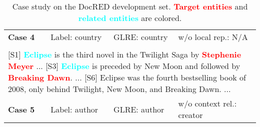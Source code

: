 \documentclass[11pt,a4paper]{article}
\begin{document}
\begin{table}
{\begin{tabular}{llll}
	\hline
		\textbf{Case 4} & Label: country & GLRE: country & w/o local rep.: N/A\\ \\
	\hline
		\multicolumn{4}{|p{1.45\columnwidth}|}{[S1] \textbf{\textcolor{cyan}{Eclipse}} is the third novel in the Twilight Saga by \textbf{\textcolor{red}{Stephenie Meyer}} ... [S3] \textbf{\textcolor{cyan}{Eclipse}} is preceded by New Moon and followed by \textbf{\textcolor{red}{Breaking Dawn}}. ... [S6] Eclipse was the fourth bestselling book of 2008, only behind Twilight, New Moon, and Breaking Dawn. ...} \\
	\hline
		\textbf{Case 5} & Label: author & GLRE: author & w/o context rel.: creator
\end{tabular}}
\caption{Case study on the DocRED development set. \textbf{\textcolor{red}{Target entities}} and \textbf{\textcolor{cyan}{related entities}} are colored.}
\label{tab:case_docred} 
\end{table}
\end{document}

